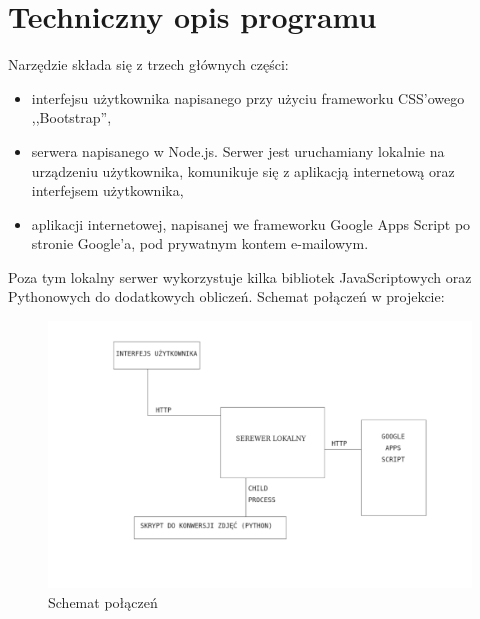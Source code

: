 \chapter{Techniczny opis programu} 
Narzędzie składa się z trzech głównych części:
\begin{itemize}
\item interfejsu użytkownika napisanego przy użyciu frameworku CSS'owego ,,Bootstrap'',
\item serwera napisanego w Node.js. Serwer jest uruchamiany lokalnie na urządzeniu użytkownika, komunikuje się z aplikacją internetową oraz interfejsem użytkownika,
\item aplikacji internetowej, napisanej we frameworku Google Apps Script po stronie Google'a, pod prywatnym kontem e-mailowym.


\end{itemize}
Poza tym lokalny serwer wykorzystuje kilka bibliotek JavaScriptowych oraz Pythonowych do dodatkowych obliczeń. Schemat połączeń w projekcie:
\begin{figure}[H]
  \includegraphics[scale=0.75]{schemat.png}
  \caption{Schemat połączeń}
  \label{fig:1}
\end{figure}
